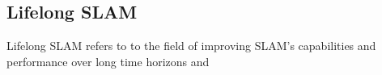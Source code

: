 \subsection{Lifelong SLAM}

Lifelong SLAM refers to to the field of improving SLAM's capabilities and performance over long time horizons and 